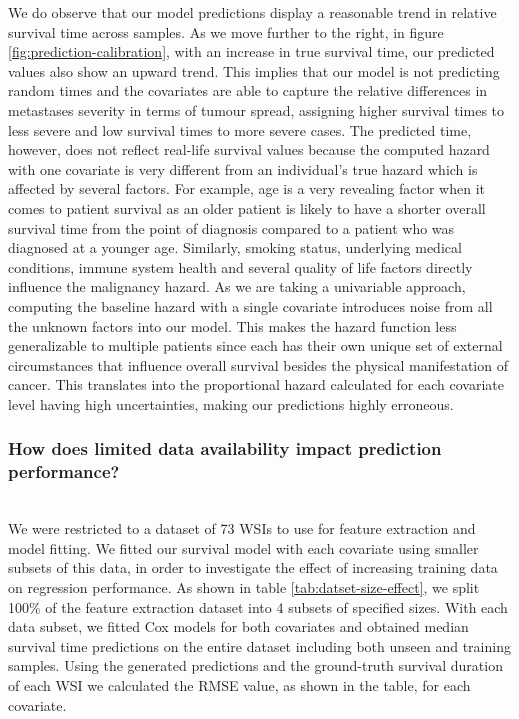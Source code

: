 \documentclass{l4proj}
\begin{document}
We do observe that our model predictions display a reasonable trend in relative survival time across samples. As we move further to the right, in figure \ref{fig:prediction-calibration}, with an increase in true survival time, our predicted values also show an upward trend. This implies that our model is not predicting random times and the covariates are able to capture the relative differences in metastases severity in terms of tumour spread, assigning higher survival times to less severe and low survival times to more severe cases. The predicted time, however, does not reflect real-life survival values because the computed hazard with one covariate is very different from an individual's true hazard which is affected by several factors. For example, age is a very revealing factor when it comes to patient survival as an older patient is likely to have a shorter overall survival time from the point of diagnosis compared to a patient who was diagnosed at a younger age. Similarly, smoking status, underlying medical conditions, immune system health and several quality of life factors directly influence the malignancy hazard. As we are taking a univariable approach, computing the baseline hazard with a single covariate introduces noise from all the unknown factors into our model. This makes the hazard function less generalizable to multiple patients since each has their own unique set of external circumstances that influence overall survival besides the physical manifestation of cancer. This translates into the proportional hazard calculated for each covariate level having high uncertainties, making our predictions highly erroneous. 

\subsubsection{How does limited data availability impact prediction performance?}\hfill \\
We were restricted to a dataset of 73 WSIs to use for feature extraction and model fitting. We fitted our survival model with each covariate using smaller subsets of this data, in order to investigate the effect of increasing training data on regression performance. As shown in table \ref{tab:datset-size-effect}, we split  100\% of the feature extraction dataset into 4 subsets of specified sizes. With each data subset, we fitted Cox models for both covariates and obtained median survival time predictions on the entire dataset including both unseen and training samples. Using the generated predictions and the ground-truth survival duration of each WSI we calculated the RMSE value, as shown in the table, for each covariate.
\end{document}
